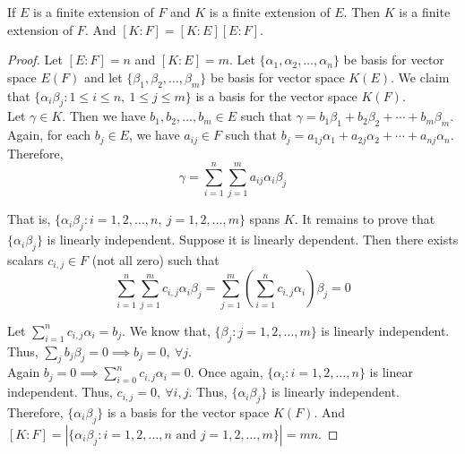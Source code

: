 \begin{theorem}
	If $E$ is a finite extension of $F$ and $K$ is a finite extension of $E$.
	Then $K$ is a finite extension of $F$.
	And $[K:F] = [K:E][E:F]$.
\end{theorem}
\begin{proof}
	Let $[E:F] = n$ and $[K:E] = m$.
	Let $\{ \alpha_1,\alpha_2,\dots,\alpha_n \}$ be basis for vector space $E(F)$ and let $\{ \beta_1,\beta_2,\dots,\beta_m\}$ be basis for vector space $K(E)$.
	We claim that $\{\alpha_i\beta_j : 1 \le i \le n,\ 1 \le j \le m \}$ is a basis for the vector space $K(F)$.\\

	Let $\gamma \in K$.
	Then we have $b_1,b_2,\dots,b_m \in E$ such that $\gamma = b_1\beta_1+b_2\beta_2+\dotsb+b_m\beta_m$.
	Again, for each $b_j \in E$, we have $a_{ij} \in F$ such that $b_j = a_{1j}\alpha_1+a_{2j}\alpha_2+\dotsb+a_{nj}\alpha_n$.
	Therefore, 
	\[\gamma = \sum_{i=1}^n \sum_{j=1}^m a_{ij} \alpha_i \beta_j\]

	That is, $\{ \alpha_i \beta_j : i =1,2,\dots,n,\ j=1,2,\dots,m \}$ spans $K$.
	It remains to prove that $\{\alpha_i \beta_j \}$ is linearly independent.
	Suppose it is linearly dependent.
	Then there exists scalars $c_{i,j} \in F$ (not all zero) such that
	\[\sum_{i=1}^n \sum_{j=1}^m c_{i,j} \alpha_i \beta_j  = \sum_{j=1}^m \left( \sum_{i=1}^n c_{i,j} \alpha_i \right) \beta_j  = 0\]
	
	Let $\sum_{i=1}^n c_{i,j}\alpha_i = b_j$.
	We know that, $\{ \beta_j : j = 1,2,\dots,m \}$ is linearly independent.
	Thus, $\sum_j b_j \beta_j = 0 \implies b_j = 0,\ \forall j$.\\
	

	Again $b_j = 0 \implies \sum_{i = 0}^n c_{i,j}\alpha_i = 0$.
	Once again, $\{ \alpha_i : i = 1,2,\dots,n \}$ is linear independent.
	Thus, $c_{i,j} = 0,\ \forall i,j$.
	Thus, $\{ \alpha_i \beta_j \}$ is linearly independent.
	Therefore, $\{ \alpha_i \beta_j \}$ is a basis for the vector space $K(F)$.
	And $[K : F] = |\{\alpha_i \beta_j : i =1,2,\dots,n \text{ and } j=1,2,\dots,m\}|= mn$.
\end{proof}


